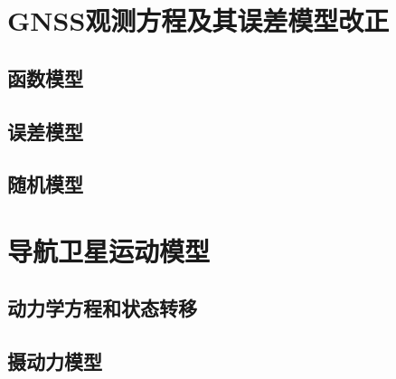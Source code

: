 \section{GNSS观测方程及其误差模型改正}

\subsection{函数模型}

\subsection{误差模型}

\subsection{随机模型}

\section{导航卫星运动模型}

\subsection{动力学方程和状态转移}

\subsection{摄动力模型}
